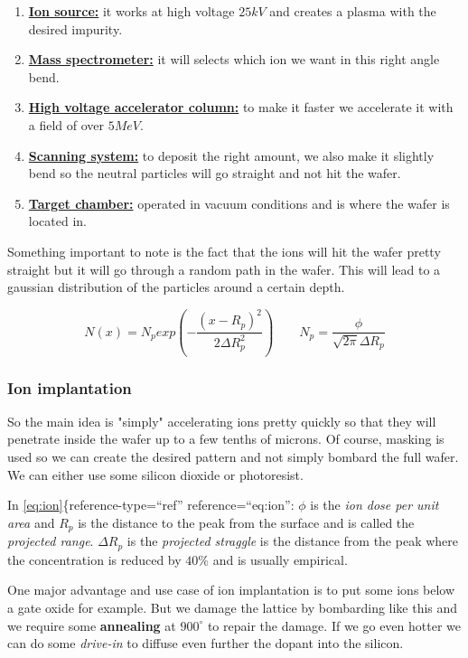 \documentclass[
]{article}
\begin{document}
\begin{enumerate}
\def\labelenumi{\arabic{enumi}.}
\item
  \ul{\textbf{Ion source:}} it works at high voltage \(25 kV\) and
  creates a plasma with the desired impurity.
\item
  \ul{\textbf{Mass spectrometer:}} it will selects which ion we want in
  this right angle bend.
\item
  \ul{\textbf{High voltage accelerator column:}} to make it faster we
  accelerate it with a field of over \(5MeV\).
\item
  \ul{\textbf{Scanning system:}} to deposit the right amount, we also
  make it slightly bend so the neutral particles will go straight and
  not hit the wafer.
\item
  \ul{\textbf{Target chamber:}} operated in vacuum conditions and is
  where the wafer is located in.
\end{enumerate}

Something important to note is the fact that the ions will hit the wafer
pretty straight but it will go through a random path in the wafer. This
will lead to a gaussian distribution of the particles around a certain
depth.

\[N(x) = N_p exp \left( - \frac{(x-R_p)^2}{2 \Delta R_p^2} \right) \qquad N_p = \frac{\phi}{\sqrt{2 \pi} \Delta R_p}
    \label{eq:ion}\]

\hypertarget{ion-implantation}{%
\subsubsection{Ion implantation}\label{ion-implantation}}

So the main idea is "simply" accelerating ions pretty quickly so that
they will penetrate inside the wafer up to a few tenths of microns. Of
course, masking is used so we can create the desired pattern and not
simply bombard the full wafer. We can either use some silicon dioxide or
photoresist.

In \protect\hyperlink{eq:ion}{{[}eq:ion{]}}\{reference-type=``ref''
reference=``eq:ion'': \(\phi\) is the \emph{ion dose per unit area} and
\(R_p\) is the distance to the peak from the surface and is called the
\emph{projected range}. \(\Delta R_p\) is the \emph{projected straggle}
is the distance from the peak where the concentration is reduced by
\(40\%\) and is usually empirical.

One major advantage and use case of ion implantation is to put some ions
below a gate oxide for example. But we damage the lattice by bombarding
like this and we require some \textbf{annealing} at \(900^\circ\) to
repair the damage. If we go even hotter we can do some \emph{drive-in}
to diffuse even further the dopant into the silicon.
\end{document}
